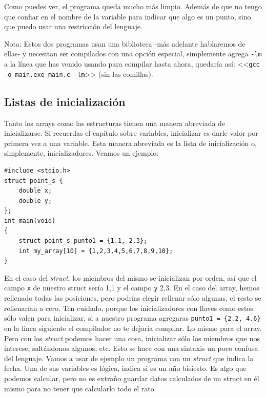 \documentclass[a4paper]{article}
\begin{document}
Como puedes ver, el programa queda mucho más limpio. Además de que
no tengo que confiar en el nombre de la variable para indicar que algo es un
punto, sino que puedo usar una restricción del lenguaje.

Nota: Estos dos programas usan una biblioteca -más adelante hablaremos de ellas-
y necesitan ser compilados con una opción especial, simplemente agrega
\texttt{-lm} a la línea que has venido usando para compilar hasta ahora,
quedaría así: <<\texttt{gcc -o main.exe main.c -lm}>> (sin las comillas).

\subsection{Listas de inicialización}

Tanto los arrays como las estructuras tienen una manera abreviada de
inicializarse. Si recuerdas el capítulo sobre variables, inicializar es darle
valor por primera vez a una variable. Esta manera abreviada es la
lista de inicialización o, simplemente, inicializadores. Veamos un ejemplo:


\noindent
\begin{minipage}[H]{\linewidth}
\mbox{}
\begin{lstlisting}[style=C,
caption={Inicialización con llaves},
label={lst:initializationLists}]
#include <stdio.h>
struct point_s {
    double x;
    double y;
};
int main(void)
{
    struct point_s punto1 = {1.1, 2.3};
    int my_array[10] = {1,2,3,4,5,6,7,8,9,10};
}
\end{lstlisting}
\end{minipage}


En el caso del \textit{struct}, los miembros del mismo se inicializan por orden,
así que el campo \verb!x! de nuestro struct sería 1,1 y el campo \verb!y!
2,3. En el
caso del array, hemos rellenado todas las posiciones, pero podrías elegir
rellenar sólo algunas, el resto se rellenarían a cero. Ten cuidado, porque los
inicializadores con llaves como estos sólo valen para inicializar, si a nuestro
programa agregaras \lstinline[style=C]!punto1 = {2.2, 4.6}! en la línea
siguiente el compilador no te dejaría compilar. Lo mismo para el array.
Pero con los \textit{struct} podemos hacer una cosa, inicializar sólo los
miembros que nos interese, saltándonos algunos, etc. Esto se hace con una
sintaxis un poco confusa del lenguaje. Vamos a usar de ejemplo un programa con
un \textit{struct} que indica la fecha. Una de sus variables es lógica, indica
si es un año bisiesto. Es algo que podemos calcular, pero no es extraño guardar
datos calculados de un struct en él mismo para no tener que calcularlo todo el
rato.
\end{document}
